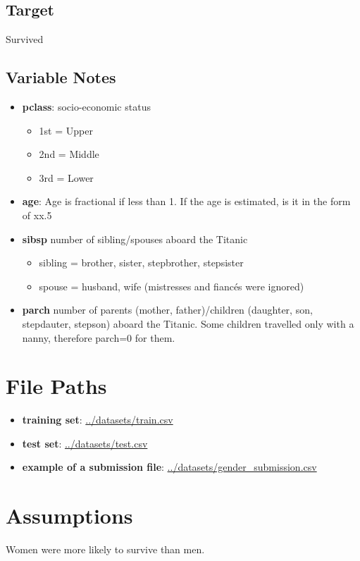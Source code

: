 \subsection{Target}
Survived


\subsection{Variable Notes}
\begin{itemize}
	\item \textbf{pclass}: socio-economic status
		\begin{itemize}
		    \item 1st = Upper
		    \item 2nd = Middle
		    \item 3rd = Lower
		\end{itemize}
	\item \textbf{age}: Age is fractional if less than 1. If the age is 
	estimated, is it in the form of xx.5
	\item \textbf{sibsp} number of sibling/spouses aboard the Titanic
		\begin{itemize}
		    \item sibling = brother, sister, stepbrother, stepsister
		    \item spouse = husband, wife (mistresses and fiancés were 
		    ignored)
		\end{itemize}
	\item \textbf{parch} number of parents (mother, father)/children 
	(daughter, son, stepdauter, stepson) aboard the Titanic. Some 
	children travelled only with a nanny, therefore parch=0 for them.
\end{itemize}


\section{File Paths}
\begin{itemize}
	\item \textbf{training set}: \url{../datasets/train.csv}
	\item \textbf{test set}: \url{../datasets/test.csv}
	\item \textbf{example of a submission file}:
	\url{../datasets/gender_submission.csv}
\end{itemize}


\section{Assumptions}
Women were more likely to survive than men.